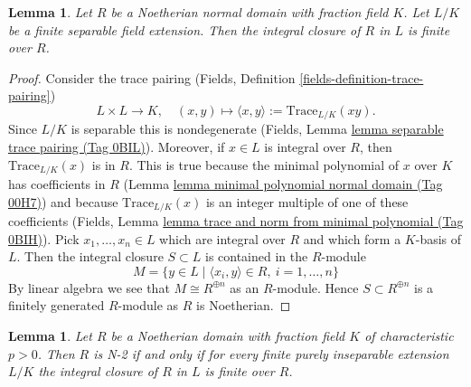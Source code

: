 \documentclass{amsart}
\theoremstyle{plain}
\newtheorem{lemma}[subsection]{Lemma}
\theoremstyle{definition}
\theoremstyle{remark}
\numberwithin{equation}{subsection}
\begin{document}
\begin{lemma}
\label{lemma-Noetherian-normal-domain-finite-separable-extension}
Let $R$ be a Noetherian normal domain with fraction field $K$.
Let $L/K$ be a finite separable field extension.
Then the integral closure of $R$ in $L$ is finite over $R$.
\end{lemma}

\begin{proof}
Consider the trace pairing
(Fields, Definition \ref{fields-definition-trace-pairing})
$$
L \times L \longrightarrow K,
\quad (x, y) \longmapsto \langle x, y\rangle := \text{Trace}_{L/K}(xy).
$$
Since $L/K$ is separable this is nondegenerate
(Fields, Lemma \href{https://stacks.math.columbia.edu/tag/0BIL}{lemma separable trace pairing (Tag 0BIL)}).
Moreover, if $x \in L$ is integral over $R$, then
$\text{Trace}_{L/K}(x)$ is in $R$. This is true because the
minimal polynomial of $x$ over $K$ has coefficients in $R$
(Lemma \href{https://stacks.math.columbia.edu/tag/00H7}{lemma minimal polynomial normal domain (Tag 00H7)})
and because $\text{Trace}_{L/K}(x)$ is an
integer multiple of one of these coefficients
(Fields, Lemma \href{https://stacks.math.columbia.edu/tag/0BIH}{lemma trace and norm from minimal polynomial (Tag 0BIH)}).
Pick $x_1, \ldots, x_n \in L$ which are integral over $R$
and which form a $K$-basis of $L$. Then the integral closure
$S \subset L$ is contained in the $R$-module
$$
M = \{y \in L \mid \langle x_i, y\rangle \in R, \ i = 1, \ldots, n\}
$$
By linear algebra we see that $M \cong R^{\oplus n}$ as an $R$-module.
Hence $S \subset R^{\oplus n}$ is a finitely generated $R$-module
as $R$ is Noetherian.
\end{proof}


\begin{lemma}
\label{lemma-domain-char-p-N-1-2}
Let $R$ be a Noetherian domain with fraction field $K$ of
characteristic $p > 0$. Then $R$ is N-2 if and only if
for every finite purely inseparable extension $L/K$ the integral
closure of $R$ in $L$ is finite over $R$.
\end{lemma}
\end{document}
